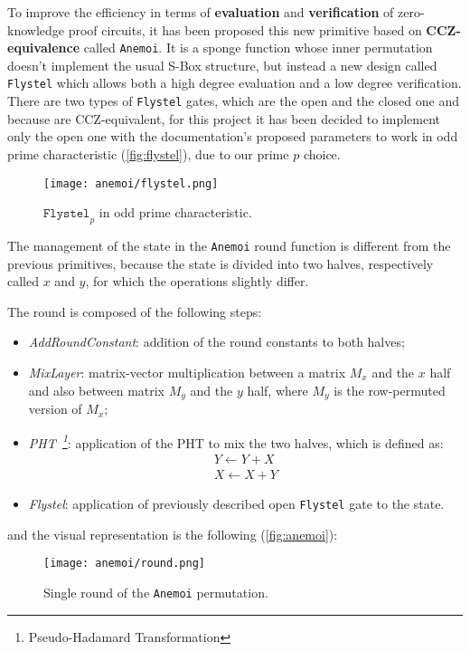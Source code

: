 \documentclass[12pt, a4paper]{report}
\begin{document}
To improve the efficiency in terms of \textbf{evaluation} and \textbf{verification} of zero-knowledge proof circuits, it has been proposed this new primitive based on \textbf{CCZ-equivalence} called \texttt{Anemoi}. It is a sponge function whose inner permutation doesn't implement the usual S-Box structure, but instead a new design called \texttt{Flystel} which allows both a high degree evaluation and a low degree verification.
There are two types of \texttt{Flystel} gates, which are the open and the closed one and because are CCZ-equivalent, for this project it has been decided to implement only the open one with the documentation's proposed parameters to work in odd prime characteristic (\autoref{fig:flystel}), due to our prime $p$ choice.

\begin{figure}[H]
  \begin{center}
    \texttt{[image: anemoi/flystel.png]}
  \end{center}
  \caption{$\texttt{Flystel}_p$ in odd prime characteristic.}\label{fig:flystel}
\end{figure}

The management of the state in the \texttt{Anemoi} round function is different from the previous primitives, because the state is divided into two halves, respectively called $x$ and $y$, for which the operations slightly differ.

The round is composed of the following steps:
\begin{itemize}
  \item \textit{AddRoundConstant}: addition of the round constants to both halves;
  \item \textit{MixLayer}: matrix-vector multiplication between a matrix $M_x$ and the $x$ half and also between matrix $M_y$ and the $y$ half, where $M_y$ is the row-permuted version of $M_x$;
  \item \textit{PHT~\footnote{Pseudo-Hadamard Transformation}}: application of the PHT to mix the two halves, which is defined as:
      \begin{gather}
        Y \leftarrow Y + X \\
        X \leftarrow X + Y
        \label{eq:pht}
      \end{gather}
  \item \textit{Flystel}: application of previously described open \texttt{Flystel} gate to the state.
\end{itemize}
and the visual representation is the following (\autoref{fig:anemoi}):
\begin{figure}[H]
  \begin{center}
    \texttt{[image: anemoi/round.png]}
  \end{center}
  \caption{Single round of the \texttt{Anemoi} permutation.}\label{fig:anemoi}
\end{figure}
\end{document}
